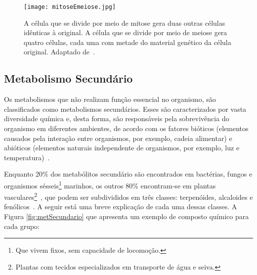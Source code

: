 \begin{figure}[h]
    \centering
    \texttt{[image: mitoseEmeiose.jpg]}
    \caption{A célula que se divide por meio de mitose gera duas outras células idênticas à original. A célula que se divide por meio de meiose gera quatro células, cada uma com metade do material genético da célula original. Adaptado de~\cite{mitoseMeiose}. }
    \label{fig:mitoseEmeiose}
\end{figure} 

\subsection{Metabolismo Secundário}

\indent Os metabolismos que não realizam função essencial no organismo, são classificados como metabolismos secundários. Esses são caracterizados por vasta diversidade química e, desta forma, são responsáveis pela sobrevivência do organismo em diferentes ambientes, de acordo com os fatores bióticos (elementos causados pela interação entre organismos, por exemplo, cadeia alimentar) e abióticos (elementos naturais independente de organismos, por exemplo, luz e temperatura)~\cite{Cap3schomburg}.

\indent Enquanto 20\% dos metabólitos secundário são encontrados em bactérias, fungos e organismos sésseis\footnote{Que vivem fixos, sem capacidade de locomoção.} marinhos, os outros 80\% encontram-se em plantas vasculares\footnote{Plantas com tecidos especializados em transporte de água e seiva.}~\cite{Cap3schomburg}, que podem ser subdivididos em três classes: terpenóides, alcaloides e fenólicos~\cite{kabera14}. A seguir está uma breve explicação de cada uma dessas classes. A Figura \ref{fig:metSecundario} que apresenta um exemplo de composto químico para cada grupo:

